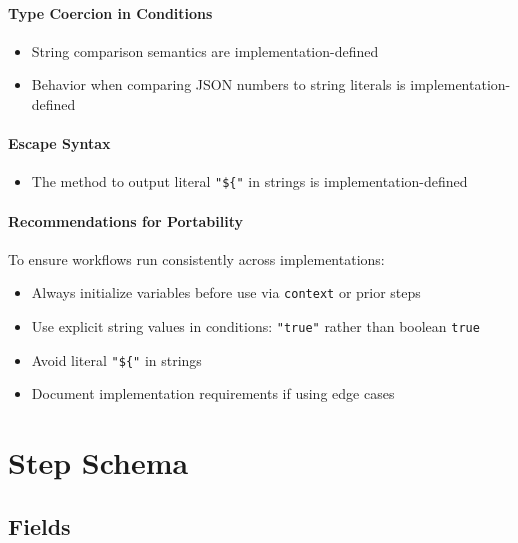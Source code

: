 \documentclass[11pt,a4paper]{article}
\begin{document}
\paragraph{Type Coercion in Conditions}
\begin{itemize}
    \item String comparison semantics are implementation-defined
    \item Behavior when comparing JSON numbers to string literals is implementation-defined
\end{itemize}

\paragraph{Escape Syntax}
\begin{itemize}
    \item The method to output literal \texttt{"\$\{"} in strings is implementation-defined
\end{itemize}

\paragraph{Recommendations for Portability}

To ensure workflows run consistently across implementations:
\begin{itemize}
    \item Always initialize variables before use via \texttt{context} or prior steps
    \item Use explicit string values in conditions: \texttt{"true"} rather than boolean \texttt{true}
    \item Avoid literal \texttt{"\$\{"} in strings
    \item Document implementation requirements if using edge cases
\end{itemize}


\section{Step Schema}

\subsection{Fields}
\end{document}
